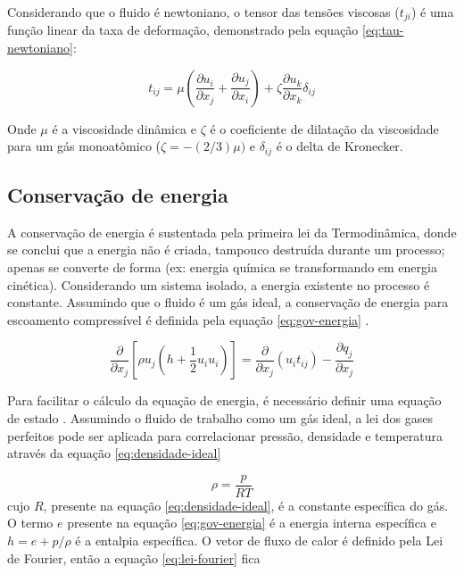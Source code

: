 Considerando que o fluido é newtoniano, o tensor das tensões viscosas ($t_{ji}$) é uma função linear da taxa de deformação, demonstrado pela equação \ref{eq:tau-newtoniano}:

\begin{equation}
    \label{eq:tau-newtoniano}
    t_{ij} = \mu \left(\frac{\partial u_i}{\partial x_j} + \frac{\partial u_j}{\partial x_i} \right) + \zeta\frac{\partial u_k}{\partial x_k}\delta_{ij}
\end{equation}

Onde $\mu$ é a viscosidade dinâmica e $\zeta$ é o coeficiente de dilatação da viscosidade para um gás monoatômico ($\zeta = -(2/3)\mu)$ e $\delta_{ij}$ é o delta de Kronecker. 

\subsection{Conservação de energia}

A conservação de energia é sustentada pela primeira lei da Termodinâmica, donde se conclui que a energia não é criada, tampouco destruída durante um processo; apenas se converte de forma (ex: energia química se transformando em energia cinética). Considerando um sistema isolado, a energia existente no processo é constante. Assumindo que o fluido é um gás ideal, a conservação de energia para escoamento compressível é definida pela equação \ref{eq:gov-energia} \cite{Moukalled2015, Wilcox2006}.

\begin{equation}
    \label{eq:gov-energia}
   \frac{\partial}{\partial x_j}\left[\rho u_j\left(h + \frac{1}{2}u_i u_i \right)\right] = \frac{\partial}{\partial x_j}\left(u_i t_{ij}\right) - \frac{\partial q_j}{\partial x_j}
\end{equation}

Para facilitar o cálculo da equação de energia, é necessário definir uma equação de estado \cite{Wilcox2006}. Assumindo o fluido de trabalho como um gás ideal, a lei dos gases perfeitos pode ser aplicada para correlacionar pressão, densidade e temperatura através da equação \ref{eq:densidade-ideal}

\begin{equation}
    \label{eq:densidade-ideal}
    \rho = \frac{p}{RT}
\end{equation}
%
cujo $R$, presente na equação \ref{eq:densidade-ideal}, é a constante específica do gás. O termo $e$ presente na equação \ref{eq:gov-energia} é a energia interna específica e $h = e + p/\rho$ é a entalpia específica. O vetor de fluxo de calor é definido pela Lei de Fourier, então a equação \ref{eq:lei-fourier} fica

